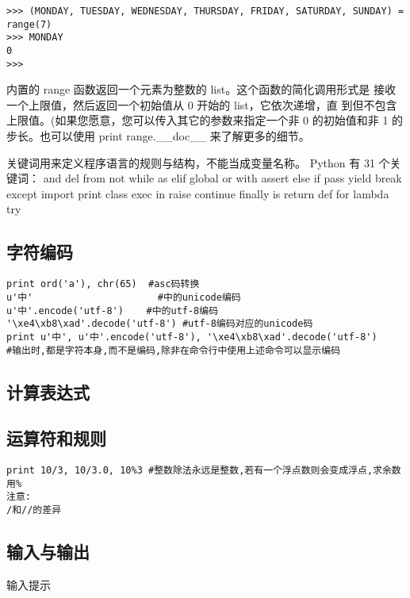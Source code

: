 \documentclass[twoside,11pt]{book}
\begin{document}
\begin{lstlisting}
>>> (MONDAY, TUESDAY, WEDNESDAY, THURSDAY, FRIDAY, SATURDAY, SUNDAY) = range(7)
>>> MONDAY
0
>>>
\end{lstlisting}

内置的 range 函数返回一个元素为整数的 list。这个函数的简化调用形式是 接收一个上限值，然后返回一个初始值从 0 开始的 list，它依次递增，直 到但不包含上限值。(如果您愿意，您可以传入其它的参数来指定一个非 0 的初始值和非 1 的步长。也可以使用 print range.\_\_doc\_\_ 来了解更多的细节。


关键词用来定义程序语言的规则与结构，不能当成变量名称。
Python 有 31 个关键词：
and del from not while
as elif global or with
assert else if pass yield
break except import print
class exec in raise
continue finally is return
def for lambda try

\subsection{字符编码}
\begin{lstlisting}
print ord('a'), chr(65)  #asc码转换
u'中'                      #中的unicode编码
u'中'.encode('utf-8')    #中的utf-8编码
'\xe4\xb8\xad'.decode('utf-8') #utf-8编码对应的unicode码
print u'中', u'中'.encode('utf-8'), '\xe4\xb8\xad'.decode('utf-8')
#输出时,都是字符本身,而不是编码,除非在命令行中使用上述命令可以显示编码
\end{lstlisting}

\subsection{计算表达式}


\subsection{运算符和规则}
\begin{lstlisting}
print 10/3, 10/3.0, 10%3 #整数除法永远是整数,若有一个浮点数则会变成浮点,求余数用%
注意:
/和//的差异
\end{lstlisting}

\subsection{输入与输出}
输入提示
\end{document}
